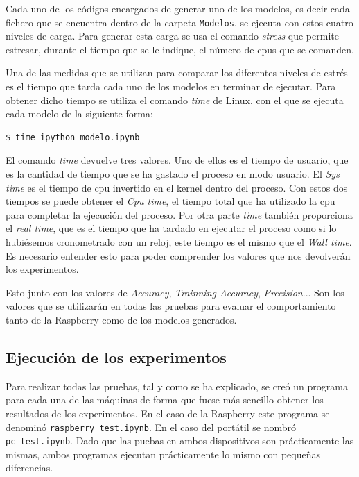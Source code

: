 \documentclass[a4paper, 12pt]{book}
\begin{document}
Cada uno de los códigos encargados de generar uno de los modelos, es decir cada fichero que se encuentra dentro de la carpeta \texttt{Modelos}, se ejecuta con estos cuatro niveles de carga. Para generar esta carga se usa el comando \textit{stress} que permite estresar, durante el tiempo que se le indique, el número de cpus que se comanden. 

Una de las medidas que se utilizan para comparar los diferentes niveles de estrés es el tiempo que tarda cada uno de los modelos en terminar de ejecutar. Para obtener dicho tiempo se utiliza el comando \textit{time} de Linux, con el que se ejecuta cada modelo de la siguiente forma:\\

\begin{lstlisting}[language=bash]
  $ time ipython modelo.ipynb
\end{lstlisting}

El comando \textit{time} devuelve tres valores. Uno de ellos es el tiempo de usuario, que es la cantidad de tiempo que se ha gastado el proceso en modo usuario. El \textit{Sys time} es el tiempo de cpu invertido en el kernel dentro del proceso. Con estos dos tiempos se puede obtener el \textit{Cpu time}, el tiempo total que ha utilizado la cpu para completar la ejecución del proceso. Por otra parte \textit{time} también proporciona el \textit{real time}, que es el tiempo que ha tardado en ejecutar el proceso como si lo hubiésemos cronometrado con un reloj, este tiempo es el mismo que el \textit{Wall time}. Es necesario entender esto para poder comprender los valores que nos devolverán los experimentos.

Esto junto con los valores de \textit{Accuracy}, \textit{Trainning Accuracy}, \textit{Precision}... Son los valores que se utilizarán en todas las pruebas para evaluar el comportamiento tanto de la Raspberry como de los modelos generados.

\subsection{Ejecución de los experimentos}
\label{subsec:ejecucion_experimentos}

Para realizar todas las pruebas, tal y como se ha explicado, se creó un programa para cada una de las máquinas de forma que fuese más sencillo obtener los resultados de los experimentos. En el caso de la Raspberry este programa se denominó \texttt{raspberry\_test.ipynb}. En el caso del portátil se nombró \texttt{pc\_test.ipynb}. Dado que las puebas en ambos dispositivos son prácticamente las mismas, ambos programas ejecutan prácticamente lo mismo con pequeñas diferencias.
\end{document}
